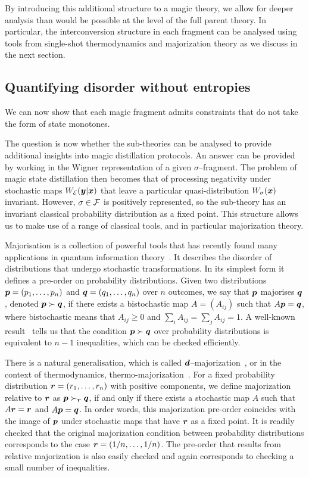 \documentclass[pra,
aps,
twocolumn,
superscriptaddress,
groupedaddress,
nofootinbib,
reprint
]{revtex4-1}
\begin{document}
By introducing this additional structure to a magic theory, we allow for deeper analysis than would be possible at the level of the full parent theory. In particular, the interconversion structure in each fragment can be analysed using tools from single-shot thermodynamics and majorization theory as we discuss in the next section.

\subsection{Quantifying disorder without entropies}
\label{sec:major}

We can now show that each magic fragment admits constraints that do not take the form of state monotones. 

The question is now whether the sub-theories can be analysed to provide additional insights into magic distillation protocols. An answer can be provided by working in the Wigner representation of a given $\sigma$--fragment. The problem of magic state distillation then becomes that of processing negativity under stochastic maps $W_{{\mathcal E}}( \boldsymbol{y} |\boldsymbol{x})$ that leave a particular quasi-distribution $W_\sigma(\boldsymbol{x})$ invariant. However, $\sigma \in {\mathcal F}$ is positively represented, so the sub-theory has an invariant classical probability distribution as a fixed point. This structure allows us to make use of a range of classical tools, and in particular majorization theory.

Majorisation is a collection of powerful tools that has recently found many applications in quantum information theory~\cite{Nielsen_1999, cit:cwiklinski, cit:lostaglio2, cit:gour, cit:gour2, Horodecki_2003, Vallejos_2021}.
It describes the disorder of distributions that undergo stochastic transformations. In its simplest form it defines a pre-order on probability distributions. Given two distributions $\boldsymbol{p}= (p_1, \dots, p_n)$ and $\boldsymbol{q} = (q_1, \dots, q_n)$ over $n$ outcomes, we say that $\boldsymbol{p}$ majorises $\boldsymbol{q}$, denoted $\boldsymbol{p} \succ \boldsymbol{q}$, if there exists a bistochastic map $A = (A_{ij})$ such that $A\boldsymbol{p} = \boldsymbol{q}$, where bistochastic means that $A_{ij} \geq 0$ and $\sum_i A_{ij} = \sum_j A_{ij} = 1$. A well-known result~\cite{cit:marshall} tells us that the condition $ \boldsymbol{p} \succ \boldsymbol{q}$ over probability distributions is equivalent to $n-1$ inequalities, which can be checked efficiently.

There is a natural generalisation, which is called $\bm{d}$--majorization~\cite{Veinott_1971}, or in the context of thermodynamics, thermo-majorization~\cite{cit:horodecki2013}. For a fixed probability distribution $\boldsymbol{r} = (r_1, \dots, r_n)$ with positive components, we define majorization relative to $\boldsymbol{r}$ as $\boldsymbol{p} \succ_{\boldsymbol{r}} \boldsymbol{q}$, if and only if there exists a stochastic map $A$ such that $A\boldsymbol{r} = \boldsymbol{r}$ and $A \boldsymbol{p} = \boldsymbol{q}$. In order words, this majorization pre-order coincides with the image of $\boldsymbol{p}$ under stochastic maps that have $\boldsymbol{r}$ as a fixed point. It is readily checked that the original majorization condition between probability distributions corresponds to the case $\boldsymbol{r} = (1/n, \dots, 1/n)$. The pre-order that results from relative majorization is also easily checked and again corresponds to checking a small number of inequalities.
\end{document}
